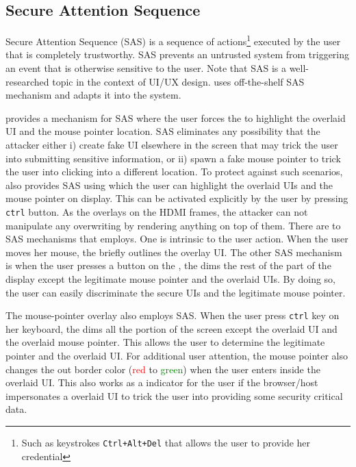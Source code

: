 \subsection{Secure Attention Sequence}
\label{sec:systemDesign:SAS}

Secure Attention Sequence (SAS) is a sequence of actions\footnote{Such as keystrokes \texttt{Ctrl+Alt+Del} that allows the user to provide her credential} executed by the user that is completely trustworthy. SAS prevents an untrusted system from triggering an event that is otherwise sensitive to the user. Note that SAS is a well-researched topic in the context of UI/UX design. \name uses off-the-shelf SAS mechanism and adapts it into the system. 

\name provides a mechanism for SAS where the user forces the \device to highlight the overlaid UI and the mouse pointer location. SAS eliminates any possibility that the attacker either i) create fake UI elsewhere in the screen that may trick the user into submitting sensitive information, or ii) spawn a fake mouse pointer to trick the user into clicking into a different location. To protect against such scenarios, \device also provides SAS using which the user can highlight the overlaid UIs and the mouse pointer on display. 
This can be activated explicitly by the user by pressing \texttt{ctrl} button.
As the \device overlays on the HDMI frames, the attacker can not manipulate any overwriting by rendering anything on top of them. 
There are to SAS mechanisms that \name employs. One is intrinsic to the user action. When the user moves her mouse, the \device briefly outlines the overlay UI. The other SAS mechanism is when the user presses a button on the \device, the \device dims the rest of the part of the display except the legitimate mouse pointer and the overlaid UIs. By doing so, the user can easily discriminate the secure UIs and the legitimate mouse pointer.

 The mouse-pointer overlay also employs SAS. When the user press \texttt{ctrl} key on her keyboard, the \device dims all the portion of the screen except the overlaid UI and the overlaid mouse pointer. This allows the user to determine the legitimate pointer and the overlaid UI. For additional user attention, the mouse pointer also changes the out border color (\textcolor{red}{red} to \textcolor{green}{green}) when the user enters inside the overlaid UI. This also works as a indicator for the user if the browser/host impersonates a overlaid UI to trick the user into providing some security critical data.
 

